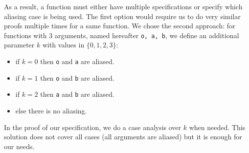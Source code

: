 As a result, a function must either have multiple specifications or specify which
aliasing case is being used.
The first option would require us to do very similar proofs multiple times for a same function.
We chose the second approach: for functions with 3 arguments, named hereafter \texttt{o, a, b},
we define an additional parameter $k$ with values in $\{0,1,2,3\}$:
\begin{itemize}
  \item if $k=0$ then \texttt{o} and \texttt{a} are aliased.
  \item if $k=1$ then \texttt{o} and \texttt{b} are aliased.
  \item if $k=2$ then \texttt{a} and \texttt{b} are aliased.
  \item else there is no aliasing.
\end{itemize}
In the proof of our specification, we do a case analysis over $k$ when needed.
This solution does not cover all cases (\eg all arguments are aliased) but it
is enough for our needs.
